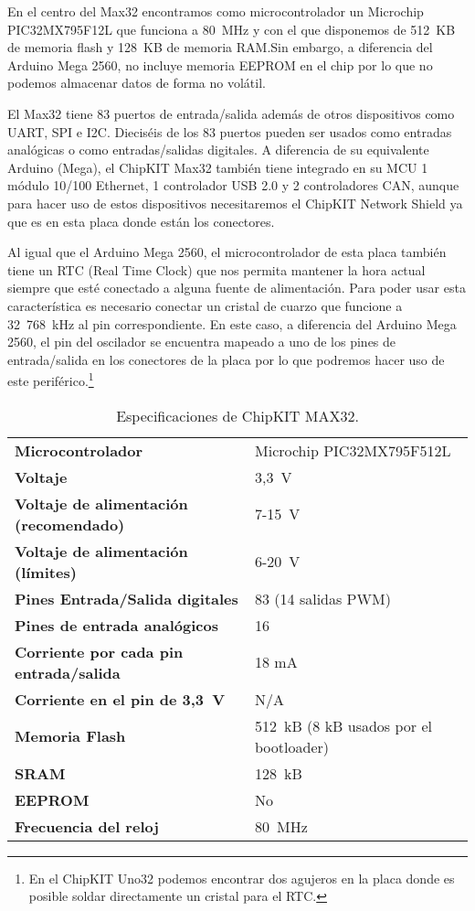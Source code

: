 En el centro del Max32 encontramos como microcontrolador un Microchip PIC32MX795F12L que funciona a 80~MHz y con el que disponemos de 512~KB de memoria flash y 128~KB de memoria RAM.\@ Sin embargo, a diferencia del Arduino Mega 2560, no incluye memoria EEPROM en el chip por lo que no podemos almacenar datos de forma no volátil. 

El Max32 tiene 83 puertos de entrada/salida además de otros dispositivos como UART, SPI e I2C. Dieciséis de los 83 puertos pueden ser usados como entradas analógicas o como entradas/salidas digitales. A diferencia de su equivalente Arduino (Mega), el ChipKIT Max32 también tiene integrado en su MCU 1 módulo 10/100 Ethernet, 1 controlador USB 2.0 y 2 controladores CAN, aunque para hacer uso de estos dispositivos necesitaremos el ChipKIT Network Shield ya que es en esta placa donde están los conectores. 

Al igual que el Arduino Mega 2560, el microcontrolador de esta placa también tiene un RTC (Real Time Clock) que nos permita mantener la hora actual siempre que esté conectado a alguna fuente de alimentación. Para poder usar esta característica es necesario conectar un cristal de cuarzo que funcione a 32~768~kHz al pin correspondiente. En este caso, a diferencia del Arduino Mega 2560, el pin del oscilador se encuentra mapeado a uno de los pines de entrada/salida en los conectores de la placa por lo que podremos hacer uso de este periférico.\footnote{En el ChipKIT Uno32 podemos encontrar dos agujeros en la placa donde es posible soldar directamente un cristal para el RTC.}

\begin{table}[H]
\begin{center}
\begin{tabular}{ll}
\textbf{Microcontrolador} 						& Microchip PIC32MX795F512L \\
\textbf{Voltaje}									& 3,3~V \\
\textbf{Voltaje de alimentación (recomendado)} 	& 7-15~V \\
\textbf{Voltaje de alimentación (límites)} 		& 6-20~V \\
\textbf{Pines Entrada/Salida digitales}			& 83 (14 salidas PWM) \\
\textbf{Pines de entrada analógicos}				& 16 \\
\textbf{Corriente por cada pin entrada/salida} 	& 18 mA \\
\textbf{Corriente en el pin de 3,3~V}				& N/A  \\
\textbf{Memoria Flash} 							& 512~kB (8 kB usados por el bootloader) \\
\textbf{SRAM}									& 128~kB \\
\textbf{EEPROM}									& No \\
\textbf{Frecuencia del reloj}					& 80~MHz \\
\end{tabular}
\end{center}
\caption{Especificaciones de ChipKIT MAX32.}
\label{tab:max32_specs}
\end{table}

